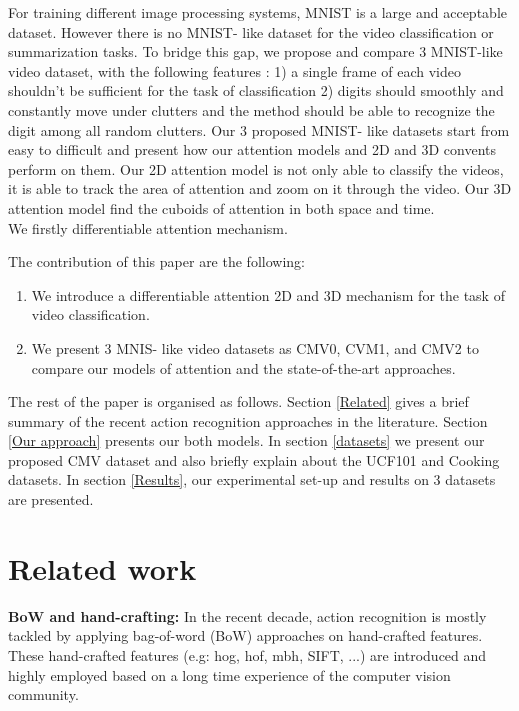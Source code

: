 \documentclass{article} %
\begin{document}
For training different image processing systems, MNIST is a large and acceptable dataset. However there is no MNIST- like dataset for the video classification or summarization tasks. To bridge this gap, we propose and compare 3 MNIST-like video dataset, with the following features : 1) a single frame of each video shouldn't be sufficient for the task of classification 2) digits should smoothly and constantly move under clutters and the method should be able to recognize the digit among all random clutters. Our 3 proposed MNIST- like datasets start from easy to difficult and present how our attention models and 2D and 3D convents perform on them. Our 2D attention model is not only able to classify the videos, it is able to track the area of attention and zoom on it through the video. Our 3D attention model find the cuboids of attention in both space and time. \\
We firstly differentiable attention mechanism. 

The contribution of this paper are the following:
\begin{enumerate}
\item We introduce a differentiable attention 2D and 3D mechanism for the task of video classification.
\item We present 3 MNIS- like video datasets as CMV0, CVM1, and CMV2 to compare our models of attention and the state-of-the-art approaches.
\end{enumerate}





The rest of the paper is organised as follows.
Section \ref{Related} gives a brief summary of the recent action recognition approaches in the literature. 
Section \ref{Our approach} presents our both models. In section \ref{datasets} we present our proposed CMV dataset and also briefly explain about the UCF101 and Cooking datasets. In section \ref{Results}, our experimental set-up and results on 3 datasets are presented.
\section{Related work}
\textbf{BoW and hand-crafting:} In the recent decade, action recognition is mostly tackled by applying bag-of-word (BoW) approaches on hand-crafted features. These hand-crafted features (e.g: hog, hof, mbh, SIFT, ...) are introduced and highly employed based on a long time experience of the computer vision community. 
\end{document}
